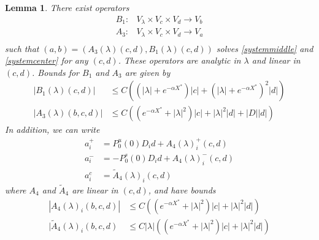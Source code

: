 \documentclass[10pt,reqno]{amsart}
\theoremstyle{plain}
\newtheorem{lemma}[theorem]{Lemma}
\theoremstyle{definition}
\theoremstyle{remark}
\numberwithin{theorem}{section}
\numberwithin{equation}{section}
\begin{document}
\begin{lemma}\label{Zinv2}
There exist operators
\begin{align*}
B_1: &V_\lambda \times V_c \times V_d \rightarrow V_b \\
A_3: &V_\lambda \times V_c \times V_d \rightarrow V_a \\
\end{align*}
such that $( a, b ) = ( A_3(\lambda)(c, d), B_1(\lambda)(c, d) )$ solves \eqref{systemmiddle} and \eqref{systemcenter} for any $(c, d)$. These operators are analytic in $\lambda$ and linear in $(c, d)$. Bounds for $B_1$ and $A_3$ are given by
\begin{align}
|B_1(\lambda)(c, d)| &\leq C\left( (|\lambda|+e^{-\alpha X^*})|c| + (|\lambda| + e^{-\alpha X^*})^2 |d| \right) \label{B1bound} \\
|A_3(\lambda)(b, c, d)| &\leq C \left( (e^{-\alpha X^*} + |\lambda|^2) |c| + |\lambda|^2 |d| + |D||d| \right) \label{A3bound} 
\end{align} 
In addition, we can write
\begin{align*}
a_i^+ &= P_0^u(0) D_i d + A_4(\lambda)_i^+(c, d) \\
a_i^- &= -P_0^s(0) D_i d + A_4(\lambda)_i^-(c, d) \\
a_i^c &= \tilde{A}_4(\lambda)_i(c, d) 
\end{align*}
where $A_4$ and $\tilde{A}_4$ are linear in $(c, d)$, and have bounds
\begin{align}
|A_4(\lambda)_i(b, c, d)|
&\leq C \left( (e^{-\alpha X^*} + |\lambda|^2)|c| + |\lambda|^2|d| \right) \label{A4bound} \\
|\tilde{A}_4(\lambda)_i(b, c, d) &\leq C |\lambda| \left( (e^{-\alpha X^*} + |\lambda|^2) |c| +|\lambda|^2 |d| \right) \label{tildeA4bound}
\end{align}


\end{lemma}
\end{document}
